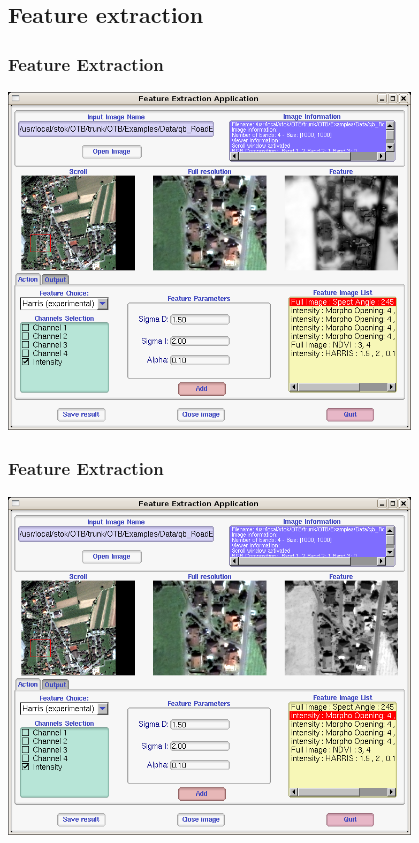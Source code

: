 \documentclass[compress]{beamer}
\begin{document}
\subsection{Feature extraction}

\begin{frame}
  \frametitle{Feature Extraction}
      \begin{center}
      \includegraphics[width=0.80\textwidth]{Images/feature1.png}
  \end{center}
\end{frame}


\begin{frame}
  \frametitle{Feature Extraction}
      \begin{center}
      \includegraphics[width=0.80\textwidth]{Images/feature2.png}
  \end{center}
\end{frame}
\end{document}
